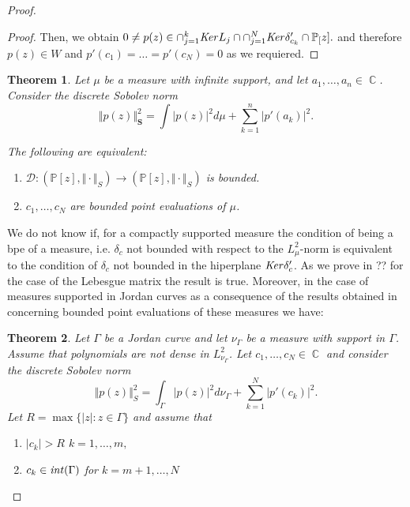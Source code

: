 \documentclass[12pt]{amsart}
\theoremstyle{definition}
\theoremstyle{plain}
\newtheorem{theorem}{Theorem}
\theoremstyle{remark}
\DeclareMathOperator{\CC}{\mathbb C}
\begin{document}
\begin{proof}
\begin{proof}
 \noindent Then, we obtain $0 \neq p(z)\in \cap_{j=1}^k {\it Ker} L_j \cap \cap_{j=1}^N {\it Ker} \delta'_{c_k}\cap \mathbb{P}_[z].
 $
and therefore $p(z)\in W$ and $p'(c_1)= \dots = p'(c_N)=0$ as we requiered. 
\end{proof}
\begin{theorem}  Let $\mu$ be a measure with infinite support, and let 
$a_1,\dots ,a_n\in \CC$. Consider the discrete Sobolev norm 
\begin{equation} 
\Vert p(z) \Vert^2_{\mathbf{S}}= \int \vert p(z) \vert^{2} d\mu + \sum_{k=1}^{n} \vert p'(a_k) \vert^{2}.
\end{equation}

\noindent The following are equivalent: 
\begin{enumerate}
    \item $\mathcal{D}:(\mathbb{P}[z], \Vert \cdot \Vert_{S})\to  (\mathbb{P}[z], \Vert \cdot \Vert_{S})$ is bounded. 
    \item $c_1,\dots,c_N$ are bounded point evaluations of $\mu$.
\end{enumerate}

    
\end{theorem}

\noindent  We do not know if, for a compactly supported measure the condition of  being a bpe of a measure, i.e. $\delta_c$ not bounded with respect to the $L^2_{\mu}$-norm is equivalent to the condition of $\delta_c$ not bounded in the hiperplane ${\it Ker} \delta'_c$. As we prove in ?? for the case of the Lebesgue matrix the result is true. Moreover, in the case of  measures supported in Jordan curves as a consequence of the  results obtained in  \cite{EGT-curvas} concerning bounded point evaluations of these measures we have: 


\begin{theorem} Let  $\Gamma$ be a Jordan curve and let $\nu_{\Gamma}$ be a measure with support in $\Gamma$. Assume that polynomials are not dense in $L^{2}_{\nu_{\Gamma}}$. 
\noindent Let  $c_1,\dots,c_N\in \CC$ and consider the discrete Sobolev norm 
$$
\Vert p(z) \Vert^2_S= \int_{\Gamma} \vert p(z) \vert^2d\nu_{\Gamma}+\sum_{k=1}^{N} \vert p'(c_k)\vert^2.
$$
\noindent Let  $R=\max \{\vert z \vert : z\in \Gamma\}$ and assume that 
\begin{enumerate}
    \item $\vert c_k \vert > R $ $k=1,\dots,m,$
    \medskip
    \item $ c_k \in {\it int}(\Gamma)$ for $k=m+1,\dots,N$    
\end{enumerate}



\end{theorem}
\end{proof}
\end{document}

